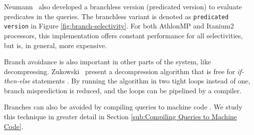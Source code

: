 Neumann \ea~also developed a branchless version (predicated version) to evaluate predicates in the queries. The branchless variant is denoted as \texttt{predicated version} in Figure \ref{fig:branch-selectivity}. For both AthlonMP and Itanium2 processors, this implementation offers constant performance for all selectivities, but is, in general, more expensive.

Branch avoidance is also important in other parts of the system, like decompressing. Zukowski \ea~present a decompression algorithm that is free for \textit{if-then-else} statements \cite{Zukowski2006-oz}. By running the algorithm in two tight loops instead of one, branch misprediction is reduced, and the loops can be pipelined by a compiler.

Branches can also be avoided by compiling queries to machine code \cite{Lamb2012-kg}. We study this technique in greater detail in Section \ref{sub:Compiling Queries to Machine Code}.

